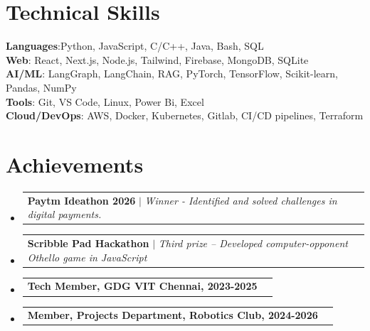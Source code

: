 \documentclass[letterpaper,11pt]{article}
\makeatletter
\newcommand{\resumeProjectHeading}[2]{
    \item
    \begin{tabular*}{0.97\textwidth}{l@{\extracolsep{\fill}}r}
      \small#1 & #2 \\
    \end{tabular*}\vspace{-8pt}
}
\newcommand{\resumeSubHeadingListStart}{\begin{itemize}[leftmargin=0.15in, label={}]}
\newcommand{\resumeSubHeadingListEnd}{\end{itemize}}
\makeatother
\begin{document}
\section{Technical Skills}
 \begin{itemize}[leftmargin=0.15in, label={}]
    \small{\item{
     \textbf{Languages}{:Python, JavaScript, C/C++, Java, Bash, SQL} \\
     \textbf{Web}{: React, Next.js, Node.js, Tailwind, Firebase, MongoDB, SQLite} \\
     \textbf{AI/ML}{: LangGraph, LangChain, RAG, PyTorch, TensorFlow, Scikit-learn, Pandas, NumPy} \\
     \textbf{Tools}{: Git, VS Code, Linux, Power Bi, Excel} \\
     \textbf{Cloud/DevOps}{: AWS, Docker, Kubernetes, Gitlab, CI/CD pipelines, Terraform} \\
    }}
 \end{itemize}
 \vspace{-15pt}
\section{Achievements}
  \resumeSubHeadingListStart
    \resumeProjectHeading
      {\textbf{Paytm Ideathon 2026} $|$ \emph{Winner - Identified and solved challenges in digital payments.}}{}
    \resumeProjectHeading
      {\textbf{Scribble Pad Hackathon} $|$ \emph{Third prize -- Developed computer-opponent Othello game in JavaScript}}{}
      \resumeProjectHeading
      {\textbf{Tech Member, GDG VIT Chennai, 2023-2025}}{}
      \resumeProjectHeading
      {\textbf{Member, Projects Department, Robotics Club, 2024-2026}}{}
  \resumeSubHeadingListEnd
\end{document}
